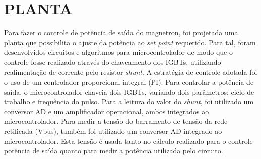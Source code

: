 \section{PLANTA}
\label{sec:plant}
Para fazer o controle de potência de saída do magnetron, foi projetada uma planta que possibilita o ajuste da potência ao \textit{set point} requerido. Para tal, foram desenvolvidos circuitos e algoritmos para microcontrolador de modo que o controle fosse realizado através do chaveamento dos IGBTs, utilizando realimentação de corrente pelo resistor \textit{shunt}. A estratégia de controle adotada foi o uso de um controlador proporcional integral (PI). Para controlar a potência de saída, o microcontrolador chaveia dois IGBTs, variando dois parâmetros: ciclo de trabalho e frequência do pulso. Para a leitura do valor do \textit{shunt}, foi utilizado um conversor AD e um amplificador operacional, ambos integrados ao microcontrolador. Para medir a tensão do barramento de tensão da rede retificada (Vbus), também foi utilizado um conversor AD integrado ao microcontrolador. Esta tensão é usada tanto no cálculo realizado para o controle potência de saída quanto para medir a potência utilizada pelo circuito.

